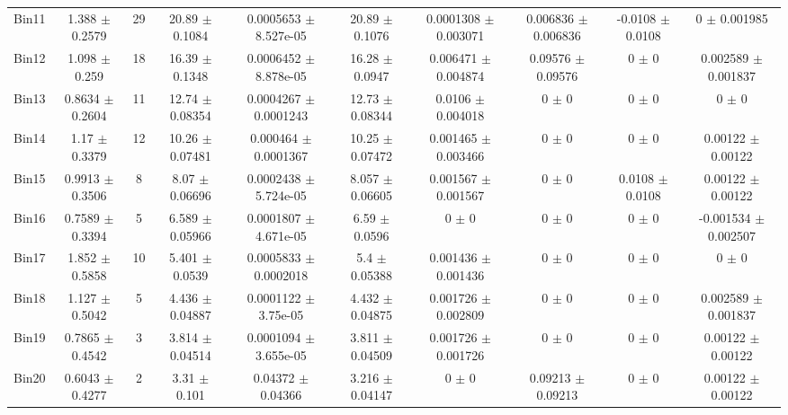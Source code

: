 \begin{tabular}{@{\extracolsep{4pt}}lccccccccc@{}}
     Bin11 & 1.388 $\pm$ 0.2579 & 29 & 20.89 $\pm$ 0.1084 & 0.0005653 $\pm$ 8.527e-05 & 20.89 $\pm$ 0.1076 & 0.0001308 $\pm$ 0.003071 & 0.006836 $\pm$ 0.006836 & -0.0108 $\pm$ 0.0108 & 0 $\pm$ 0.001985 \\ 
     Bin12 & 1.098 $\pm$ 0.259 & 18 & 16.39 $\pm$ 0.1348 & 0.0006452 $\pm$ 8.878e-05 & 16.28 $\pm$ 0.0947 & 0.006471 $\pm$ 0.004874 & 0.09576 $\pm$ 0.09576 & 0 $\pm$ 0 & 0.002589 $\pm$ 0.001837 \\ 
     Bin13 & 0.8634 $\pm$ 0.2604 & 11 & 12.74 $\pm$ 0.08354 & 0.0004267 $\pm$ 0.0001243 & 12.73 $\pm$ 0.08344 & 0.0106 $\pm$ 0.004018 & 0 $\pm$ 0 & 0 $\pm$ 0 & 0 $\pm$ 0 \\ 
     Bin14 & 1.17 $\pm$ 0.3379 & 12 & 10.26 $\pm$ 0.07481 & 0.000464 $\pm$ 0.0001367 & 10.25 $\pm$ 0.07472 & 0.001465 $\pm$ 0.003466 & 0 $\pm$ 0 & 0 $\pm$ 0 & 0.00122 $\pm$ 0.00122 \\ 
     Bin15 & 0.9913 $\pm$ 0.3506 & 8 & 8.07 $\pm$ 0.06696 & 0.0002438 $\pm$ 5.724e-05 & 8.057 $\pm$ 0.06605 & 0.001567 $\pm$ 0.001567 & 0 $\pm$ 0 & 0.0108 $\pm$ 0.0108 & 0.00122 $\pm$ 0.00122 \\ 
     Bin16 & 0.7589 $\pm$ 0.3394 & 5 & 6.589 $\pm$ 0.05966 & 0.0001807 $\pm$ 4.671e-05 & 6.59 $\pm$ 0.0596 & 0 $\pm$ 0 & 0 $\pm$ 0 & 0 $\pm$ 0 & -0.001534 $\pm$ 0.002507 \\ 
     Bin17 & 1.852 $\pm$ 0.5858 & 10 & 5.401 $\pm$ 0.0539 & 0.0005833 $\pm$ 0.0002018 & 5.4 $\pm$ 0.05388 & 0.001436 $\pm$ 0.001436 & 0 $\pm$ 0 & 0 $\pm$ 0 & 0 $\pm$ 0 \\ 
     Bin18 & 1.127 $\pm$ 0.5042 & 5 & 4.436 $\pm$ 0.04887 & 0.0001122 $\pm$ 3.75e-05 & 4.432 $\pm$ 0.04875 & 0.001726 $\pm$ 0.002809 & 0 $\pm$ 0 & 0 $\pm$ 0 & 0.002589 $\pm$ 0.001837 \\ 
     Bin19 & 0.7865 $\pm$ 0.4542 & 3 & 3.814 $\pm$ 0.04514 & 0.0001094 $\pm$ 3.655e-05 & 3.811 $\pm$ 0.04509 & 0.001726 $\pm$ 0.001726 & 0 $\pm$ 0 & 0 $\pm$ 0 & 0.00122 $\pm$ 0.00122 \\ 
     Bin20 & 0.6043 $\pm$ 0.4277 & 2 & 3.31 $\pm$ 0.101 & 0.04372 $\pm$ 0.04366 & 3.216 $\pm$ 0.04147 & 0 $\pm$ 0 & 0.09213 $\pm$ 0.09213 & 0 $\pm$ 0 & 0.00122 $\pm$ 0.00122 \\ 
\hline\hline
  \end{tabular}
